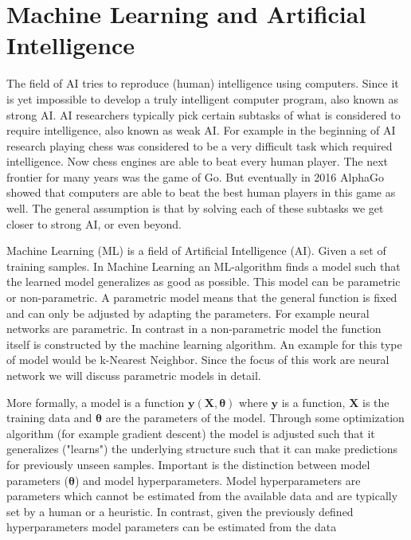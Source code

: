 \documentclass[draft,final,oneside]{vutinfth} %
\begin{document}
\section{Machine Learning and Artificial Intelligence}
The field of AI tries to reproduce (human) intelligence using computers. Since it is yet impossible to develop a truly intelligent computer program, also known as strong AI. AI researchers typically pick certain subtasks of what is considered to require intelligence, also known as weak AI. For example in the beginning of AI research playing chess was considered to be a very difficult task which required intelligence. Now chess engines are able to beat every human player. The next frontier for many years was the game of Go. But eventually in 2016 AlphaGo showed that computers are able to beat the best human players in this game as well. The general assumption is that by solving each of these subtasks we get closer to strong AI, or even beyond.



Machine Learning (ML) is a field of Artificial Intelligence (AI). Given a set of training samples. In Machine Learning an ML-algorithm finds a model such that the learned model generalizes as good as possible. This model can be parametric or non-parametric. A parametric model means that the general function is fixed and can only be adjusted by adapting the parameters. For example neural networks are parametric. In contrast in a non-parametric model the function itself is constructed by the machine learning algorithm. An example for this type of model would be k-Nearest Neighbor. Since the focus of this work are neural network we will discuss parametric models in detail.

More formally, a model is a function $\boldsymbol{y}(\boldsymbol{X}, \boldsymbol{\theta})$ where $\boldsymbol{y}$ is a function, $\boldsymbol{X}$ is the training data and $\boldsymbol{\theta}$ are the parameters of the model. Through some optimization algorithm (for example gradient descent) the model is adjusted such that it generalizes ("learns") the underlying structure such that it can make predictions for previously unseen samples. Important is the distinction between model parameters ($\boldsymbol{\theta}$) and model hyperparameters. Model hyperparameters are parameters which cannot be estimated from the available data and are typically set by a human or a heuristic. In contrast, given the previously defined hyperparameters model parameters can be estimated from the data
\end{document}
